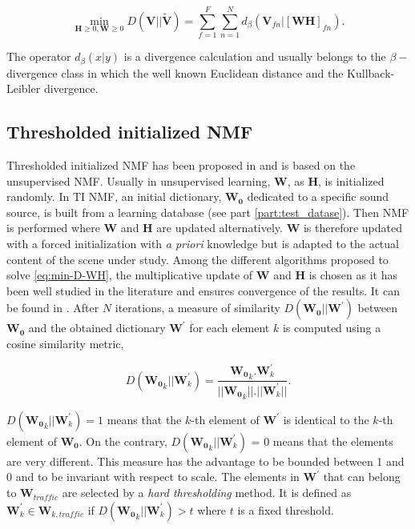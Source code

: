 \documentclass[12pt,english,twoside]{article}
\begin{document}
\begin{equation}\label{eq:min-D-WH}
\underset{\mathbf{H} \geq 0, \mathbf{W} \geq 0}{\min} D\left(\mathbf{V} \vert \vert \mathbf{\tilde{V}}\right) = \sum_{f = 1}^{F} \sum_{n = 1}^{N} d_{\beta}
\left(\textbf{V}_{fn} \vert \left[ \textbf{WH} \right]_{fn} \right).
\end{equation}

The operator $d_{\beta}(x\vert y)$ is a divergence calculation and usually belongs to the $\beta-$divergence class \cite{fevotte_nonnegative_2009} in which the well known Euclidean distance and the Kullback-Leibler divergence.

\subsection{Thresholded initialized NMF}
Thresholded initialized NMF has been proposed in \cite{gloaguen2019road} and is based on the unsupervised NMF. Usually in unsupervised learning, $\mathbf{W}$, as  $\mathbf{H}$, is initialized randomly. In TI NMF, an initial dictionary, $\mathbf{W_0}$ dedicated to a specific sound source, is built from a learning database (see part \ref{part:test_datase}).
Then NMF is performed where $\mathbf{W}$ and $\mathbf{H}$ are updated alternatively. $\mathbf{W}$ is therefore updated with a forced initialization with \textit{a priori} knowledge but is adapted to the actual content of the scene under study. Among the different algorithms proposed to solve \ref{eq:min-D-WH}, the multiplicative update of $\mathbf{W}$ and $\mathbf{H}$ is chosen as it has been well studied in the literature and ensures convergence of the results. It can be found in \cite{fevotte_algorithms_2011}.
After $N$ iterations, a measure of similarity $D\left(\mathbf{W_0} \vert \vert \mathbf{W}^{'} \right)$ between $\mathbf{W_0}$ and the obtained dictionary $\mathbf{W}^{'}$ for each element $k$ is computed using a cosine similarity metric,

\begin{equation}
D\left(\mathbf{W_0}_k \vert \vert \mathbf{W}^{'}_k \right) = \frac{\mathbf{W_0}_k.\mathbf{W}^{'}_k}{\vert \vert \mathbf{W_0}_k  \vert \vert . \vert \vert \mathbf{W}^{'}_k \vert \vert}.
\end{equation}

$D\left(\mathbf{W_0}_k \vert \vert \mathbf{W}^{'}_k \right) = 1$ means that the $k$-th element of $\mathbf{W}^{'}$ is identical to the $k$-th element of $\mathbf{W_0}$. On the contrary, $D\left(\mathbf{W_0}_k \vert \vert \mathbf{W}^{'}_k \right)$ = 0 means that the elements are very different. This measure has the advantage to be bounded between 1 and 0 and to be invariant with respect to scale. The elements in $\mathbf{W}^{'}$ that can belong to $\mathbf{W}_{traffic}$ are selected by a \textit{hard thresholding} method. It is defined as $\mathbf{W}^{'}_k \in \mathbf{W}_{k,traffic}$ if $D\left(\mathbf{W_0}_k \vert \vert \mathbf{W}^{'}_{k} \right) > t$ where $t$ is a fixed threshold.
\end{document}
